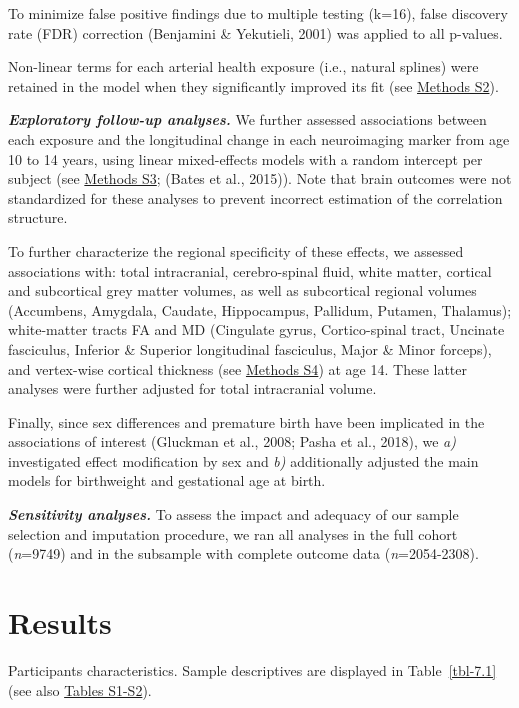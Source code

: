 \documentclass[
  letterpaper,
  DIV=11,
  numbers=noendperiod]{scrreport}
\begin{document}
To minimize false positive findings due to multiple testing (k=16),
false discovery rate (FDR) correction (Benjamini \& Yekutieli, 2001) was
applied to all p-values.

Non-linear terms for each arterial health exposure (i.e., natural
splines) were retained in the model when they significantly improved its
fit (see \href{https://osf.io/2f4sg}{Methods S2}).

\textbf{\emph{Exploratory follow-up analyses.}} We further assessed
associations between each exposure and the longitudinal change in each
neuroimaging marker from age 10 to 14 years, using linear mixed-effects
models with a random intercept per subject (see
\href{https://osf.io/2f4sg}{Methods S3}; (Bates et al., 2015)). Note
that brain outcomes were not standardized for these analyses to prevent
incorrect estimation of the correlation structure.

To further characterize the regional specificity of these effects, we
assessed associations with: total intracranial, cerebro-spinal fluid,
white matter, cortical and subcortical grey matter volumes, as well as
subcortical regional volumes (Accumbens, Amygdala, Caudate, Hippocampus,
Pallidum, Putamen, Thalamus); white-matter tracts FA and MD (Cingulate
gyrus, Cortico-spinal tract, Uncinate fasciculus, Inferior \& Superior
longitudinal fasciculus, Major \& Minor forceps), and vertex-wise
cortical thickness (see \href{https://osf.io/2f4sg}{Methods S4}) at age
14. These latter analyses were further adjusted for total intracranial
volume.

Finally, since sex differences and premature birth have been implicated
in the associations of interest (Gluckman et al., 2008; Pasha et al.,
2018), we \emph{a)} investigated effect modification by sex and
\emph{b)} additionally adjusted the main models for birthweight and
gestational age at birth.

\textbf{\emph{Sensitivity analyses.}} To assess the impact and adequacy
of our sample selection and imputation procedure, we ran all analyses in
the full cohort (\emph{n}=9749) and in the subsample with complete
outcome data (\emph{n}=2054-2308).

\section{Results}\label{results-3}

Participants characteristics. Sample descriptives are displayed in
Table~\ref{tbl-7.1} (see also \href{https://osf.io/2f4sg}{Tables
S1-S2}).
\end{document}
